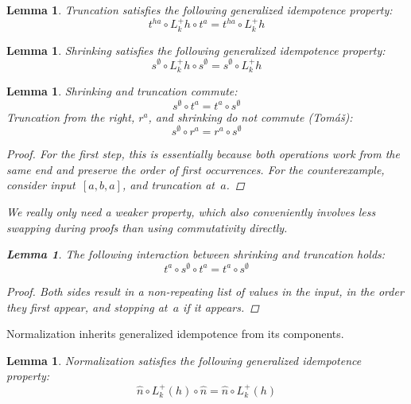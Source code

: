 \documentclass{article}
\theoremstyle{plain}
\newtheorem{lemma}[theorem]{Lemma}
\theoremstyle{definition}
\theoremstyle{remark}
\numberwithin{theorem}{section}
\begin{document}
\begin{lemma}
\label{lem:t-idem}
Truncation satisfies the following generalized idempotence property:
\begin{equation*}
t^{h a} \circ L^+_k h \circ t^a = t^{h a} \circ L^+_k h
\end{equation*}
\end{lemma}
\begin{lemma}
\label{lem:s-idem}
Shrinking satisfies the following generalized idempotence property:
\begin{equation*}
    s^\emptyset \circ L^+_k h \circ s^\emptyset = s^\emptyset \circ L^+_k h
\end{equation*}
\end{lemma}
\begin{lemma}
\label{lem:t-s-do-not-commute}
Shrinking and truncation commute:
\begin{equation*}
    s^\emptyset \circ t^a = t^a \circ s^\emptyset
\end{equation*}
Truncation from the right, $r^a$, and shrinking do not commute (Tom\'a\v{s}):
\begin{equation*}
    s^\emptyset \circ r^a = r^a \circ s^\emptyset
\end{equation*}
\begin{proof}
For the first step, this is essentially because both operations work from the same end
and preserve the order of first occurrences.
For the counterexample, consider input~$[a,b,a]$, and truncation at~$a$.
\end{proof}
We really only need a weaker property, which also conveniently involves less swapping during proofs
than using commutativity directly.
\begin{lemma}
\label{lem:t-s-interaction}
The following interaction between shrinking and truncation holds:
\begin{equation*}
    t^a \circ s^\emptyset \circ t^a = t^a \circ s^\emptyset
\end{equation*}
\end{lemma}
\begin{proof}
Both sides result in a non-repeating list of values in the input, in the order they first appear, and stopping at~$a$ if it appears.
\end{proof}
\end{lemma}
Normalization inherits generalized idempotence from its components.
\begin{lemma}
\label{lem:n-idem}
Normalization satisfies the following generalized idempotence property:
\begin{equation*}
    \hat{n} \circ L^+_k(h) \circ \hat{n} = \hat{n} \circ L^+_k(h)
\end{equation*}
\end{lemma}
\end{document}
